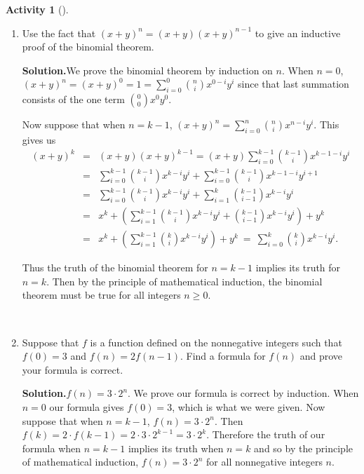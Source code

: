 \documentclass[10pt,]{book}
\theoremstyle{plain}
\theoremstyle{definition}
\newtheorem{activity}[project]{Activity}
\numberwithin{equation}{chapter}
\newcommand{\amp}{&}
\begin{document}
\begin{activity}[]\label{activity-73}
~\par
\begin{enumerate}[label=(\alph*)]
 \item Use the fact that \((x+y)^n = (x+y)(x+y)^{n-1}\) to give an inductive proof of the binomial theorem.%
\par\medskip\noindent%
\textbf{Solution.}\quad We prove the binomial theorem by induction on \(n\). When \(n=0\), \((x+y)^n=(x+y)^0=1=\sum_{i=0}^0 \binom{n}{i}x^{0-i}y^i\) since that last summation consists of the one term \(\binom{0}{0}x^0y^0\).%
\par
Now suppose that when \(n=k-1\), \((x+y)^n=\sum_{i=0}^n \binom{n}{i}x^{n-i}y^i.\) This gives us%
\begin{align*}
(x+y)^k\amp =\amp (x+y)(x+y)^{k-1}=(x+y)\sum_{i=0}^{k-1}\binom{k-1}{i}x^{k-1-i}y^i\\
\amp =\amp \sum_{i=0}^{k-1}\binom{k-1}{i}x^{k-i}y^i+\sum_{i=0}^{k-1} \binom{k-1}{i}x^{k-1-i}y^{i+1}\\
\amp =\amp \sum_{i=0}^{k-1}\binom{k-1}{i}x^{k-i}y^i+\sum_{i=1}^{k} \binom{k-1}{i-1}x^{k-i}y^{i}\\
\amp =\amp  x^k+\left(\sum_{i=1}^{k-1}\binom{k-1}{i}x^{k-i}y^i+\binom{k-1}{i-1}x^{k-i}y^i\right) +y^k\\
\amp =\amp  x^k+\left(\sum_{i=1}^{k-1} \binom{k}{i}x^{k-i}y^i\right) +y^k\ =\
\sum_{i=0}^k \binom{k}{i}x^{k-i}y^i.
\end{align*}
%
\par
Thus the truth of the binomial theorem for \(n=k-1\) implies its truth for \(n=k\). Then by the principle of mathematical induction, the binomial theorem must be true for all integers \(n\ge 0\).%

~\par
\item Suppose that \(f\) is a function defined on the nonnegative integers such that \(f(0)=3\) and \(f(n)=2f(n-1)\). Find a formula for \(f(n)\) and prove your formula is correct.%
\par\medskip\noindent%
\textbf{Solution.}\quad \(f(n)=3\cdot2^n\). We prove our formula is correct by induction. When \(n=0\) our formula gives \(f(0)=3\), which is what we were given. Now suppose that when \(n=k-1\), \(f(n) =3\cdot2^n\). Then \(f(k)=2\cdot  f(k-1) =2\cdot 3\cdot2^{k-1}=3\cdot2^k\). Therefore the truth of our formula when \(n=k-1\) implies its truth when \(n=k\) and so by the principle of mathematical induction, \(f(n)=3\cdot 2^n\) for all nonnegative integers \(n\).%

\end{enumerate}
\end{activity}
\typeout{************************************************}
\typeout{************************************************}
\end{document}
